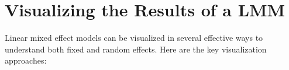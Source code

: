 \section{Visualizing the Results of a LMM}
Linear mixed effect models can be visualized in several effective ways to understand both fixed and random effects. Here are the key visualization approaches:
\printglossary[type=datacollection,style=twocolumn]
\newpage

\renewcommand{\bibname}{References}


